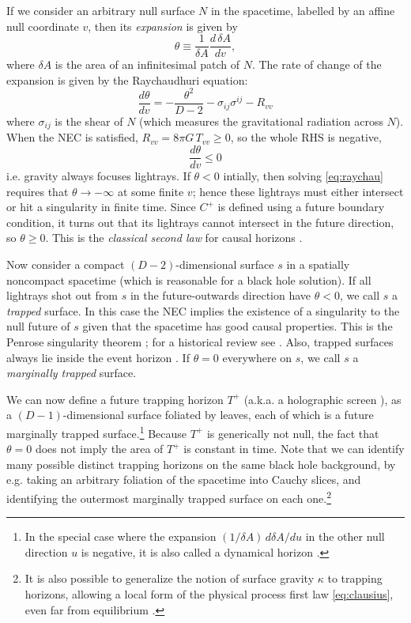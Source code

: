 \documentclass[12pt,a4paper]{article}
\def\be{\begin{equation}}
\def\ee{\end{equation}}
\begin{document}
If we consider an arbitrary null surface $N$ in the spacetime, labelled by an affine null coordinate $v$, then its \emph{expansion} is given by
\be
\theta \equiv \frac{1}{\delta A} \frac{d\,\delta A}{dv},
\ee  
where $\delta A$ is the area of an infinitesimal patch of $N$. The rate of change of the expansion is given by the Raychaudhuri equation:
\be \label{eq:raychau}
\frac{d \theta}{dv} = - \frac{\theta^2}{D-2} - \sigma_{ij} \sigma^{ij} - R_{vv}
\ee
where $\sigma_{ij}$ is the shear of $N$ (which measures the gravitational radiation across $N$). When the NEC is satisfied, $R_{vv} = 8 \pi G\,T_{vv} \ge 0$, so the whole RHS is negative, 
\be\label{Cfocus}
\frac{d \theta}{dv} \le 0
\ee
i.e. gravity always focuses lightrays. If $\theta < 0$ intially, then solving \eqref{eq:raychau} requires that $\theta \to - \infty$ at some finite $v$; hence these lightrays must either intersect or hit a singularity in finite time.  Since $C^+$ is defined using a future boundary condition, it turns out that its lightrays cannot intersect in the future direction, so $\theta \ge 0$. This is the \emph{classical second law} for causal horizons \cite{hawking1971gravitational}.

Now consider a compact $(D-2)$-dimensional surface $s$ in a spatially noncompact spacetime (which is reasonable for a black hole solution). If all lightrays shot out from $s$ in the future-outwards direction have $\theta < 0$, we call $s$ a \emph{trapped} surface. In this case the NEC implies the existence of a singularity to the null future of $s$ given that the spacetime has good causal properties. This is the Penrose singularity theorem \cite{penrose1965gravitational}; for a historical review see \cite{senovilla20151965}. Also, trapped surfaces always lie inside the event horizon \cite{hawking1973large,wald2010general}. If $\theta=0$ everywhere on $s$, we call $s$ a \emph{marginally trapped} surface.

We can now define a future trapping horizon $T^+$ \cite{hayward1994general} (a.k.a. a holographic screen \cite{bousso1999holography}), as a $(D-1)$-dimensional surface foliated by leaves, each of which is a future marginally trapped surface.\footnote{In the special case where the expansion $(1/\delta\! A)\, d\delta\! A/du$ in the other null direction $u$ is negative, it is also called a dynamical horizon \cite{ashtekar2002dynamical,ashtekar2003dynamical}.} Because $T^+$ is  generically not null, the fact that $\theta = 0$ does not imply the area of $T^+$ is constant in time.  Note that we can identify many possible distinct trapping horizons on the same black hole background, by e.g. taking an arbitrary foliation of the spacetime into Cauchy slices, and identifying the outermost marginally trapped surface on each one.\footnote{It is also possible to generalize the notion of surface gravity $\kappa$ to trapping horizons, allowing a local form of the physical process first law \eqref{eq:clausius}, even far from equilibrium \cite{hayward1994general,ashtekar2002dynamical}.}
\end{document}
